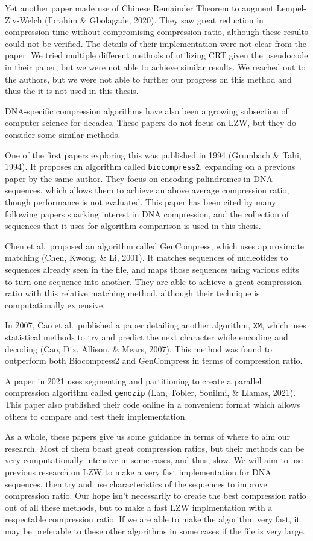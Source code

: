 \documentclass[12pt,twoside]{reedthesis}
\begin{document}
Yet another paper made use of Chinese Remainder Theorem to augment Lempel-Ziv-Welch (Ibrahim \& Gbolagade, 2020). They saw great reduction in compression time without compromising compression ratio, although these results could not be verified. The details of their implementation were not clear from the paper. We tried multiple different methods of utilizing CRT given the pseudocode in their paper, but we were not able to achieve similar results. We reached out to the authors, but we were not able to further our progress on this method and thus the it is not used in this thesis.

DNA-specific compression algorithms have also been a growing subsection of computer science for decades. These papers do not focus on LZW, but they do consider some similar methods.

One of the first papers exploring this was published in 1994 (Grumbach \& Tahi, 1994). It proposes an algorithm called \texttt{biocompress2}, expanding on a previous paper by the same author. They focus on encoding palindromes in DNA sequences, which allows them to achieve an above average compression ratio, though performance is not evaluated. This paper has been cited by many following papers sparking interest in DNA compression, and the collection of sequences that it uses for algorithm comparison is used in this thesis.

Chen et al.~proposed an algorithm called GenCompress, which uses approximate matching (Chen, Kwong, \& Li, 2001). It matches sequences of nucleotides to sequences already seen in the file, and maps those sequences using various edits to turn one sequence into another. They are able to achieve a great compression ratio with this relative matching method, although their technique is computationally expensive.

In 2007, Cao et al.~published a paper detailing another algorithm, \texttt{XM}, which uses statistical methods to try and predict the next character while encoding and decoding (Cao, Dix, Allison, \& Mears, 2007). This method was found to outperform both Biocompress2 and GenCompress in terms of compression ratio.

A paper in 2021 uses segmenting and partitioning to create a parallel compression algorithm called \texttt{genozip} (Lan, Tobler, Souilmi, \& Llamas, 2021). This paper also published their code online in a convenient format which allows others to compare and test their implementation.

As a whole, these papers give us some guidance in terms of where to aim our research. Most of them boast great compression ratios, but their methods can be very computationally intensive in some cases, and thus, slow. We will aim to use previous research on LZW to make a very fast implementation for DNA sequences, then try and use characteristics of the sequences to improve compression ratio. Our hope isn't necessarily to create the best compression ratio out of all these methods, but to make a fast LZW implmentation with a respectable compression ratio. If we are able to make the algorithm very fast, it may be preferable to these other algorithms in some cases if the file is very large.
\end{document}
